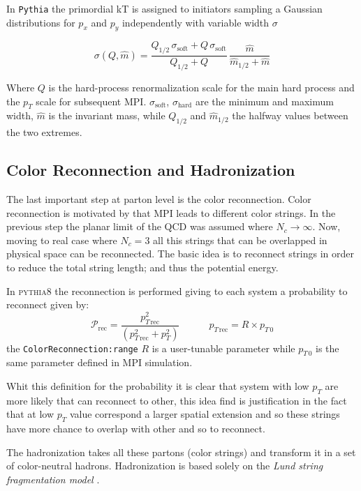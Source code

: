 In \texttt{Pythia} the primordial kT is assigned to initiators sampling a Gaussian distributions for $p_x$ and $p_y$ independently with variable width $\sigma$

\begin{equation}
	\sigma(Q,\widehat{m})=\frac{Q_{1/2}\,\sigma_{\text{soft}}+Q\,\sigma_{\text{soft}}}{Q_{1/2}+Q}\,\frac{\widehat{m}}{\widehat{m}_{1/2}+\widehat{m}}
\end{equation}
 
Where $Q$ is the hard-process renormalization scale for the main hard process and the $p_T$ scale for subsequent MPI. $\sigma_{\text{soft}}$, $\sigma_{\text{hard}}$ are the minimum and maximum width, $\widehat{m}$ is the invariant mass, while $Q_{1/2}$ and $\widehat{m}_{1/2}$ the halfway values between the two extremes.

\subsection{Color Reconnection and Hadronization }

The last important step at parton level is the color reconnection. Color reconnection is motivated by that MPI leads to different color strings. In the previous step the planar limit of the QCD was assumed where $N_c\rightarrow\infty$. Now, moving to real case where $N_c=3$ all this strings that can be overlapped in physical space can be reconnected. The basic idea is to reconnect strings in order to reduce the total string length; and thus the potential energy.

In \textsc{pythia8} the reconnection is performed giving to each system a probability to reconnect given by:
\begin{equation}
	\mathcal{P}_{\text{rec}}=\frac{p_{T\,\text{rec}}^2}{\left(p_{T\,\text{rec}}^2 + p_T^2\right)} \qquad\quad p_{T\,\text{rec}}=R\times p_{T\,0}
\end{equation} 
the \texttt{ColorReconnection:range} $R$ is a user-tunable parameter while $p_{T\,0}$ is the same parameter defined in MPI simulation.

Whit this definition for the probability it is clear that system with low $p_T$ are more likely that can reconnect to other, this idea find is justification in the fact that at low $p_T$ value correspond a larger spatial extension and so these strings have more chance to overlap with other and so to reconnect.

The hadronization takes all these partons (color strings) and transform it in a set of color-neutral hadrons. Hadronization is based solely on the \textit{Lund string fragmentation model} \cite{ANDERSSON198331, Sjostrand:1984ic}. 

